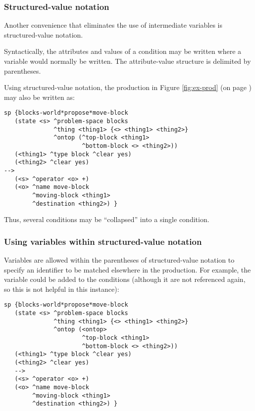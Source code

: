 \subsubsection{Structured-value notation}
\label{SYNTAX-pm-structured}    %

Another convenience that eliminates the use of intermediate variables is 
structured-value notation. 

Syntactically, the attributes and values of a condition may be written where a
variable would normally be written. The attribute-value structure is delimited
by parentheses.

Using structured-value notation, the production in Figure \ref{fig:ex-prod}
(on page \pageref{fig:ex-prod}) may also be written as:

\begin{verbatim}
sp {blocks-world*propose*move-block
   (state <s> ^problem-space blocks
              ^thing <thing1> {<> <thing1> <thing2>}
              ^ontop (^top-block <thing1>
                      ^bottom-block <> <thing2>))
   (<thing1> ^type block ^clear yes)
   (<thing2> ^clear yes)
-->
   (<s> ^operator <o> +)
   (<o> ^name move-block
        ^moving-block <thing1>
        ^destination <thing2>) }
\end{verbatim}

Thus, several conditions may be ``collapsed'' into a single condition.


\subsubsection*{Using variables within structured-value notation}

Variables are allowed within the parentheses of structured-value notation to
specify an identifier to be matched elsewhere in the production. For example,
the variable  could be added to the conditions (although it are
not referenced again, so this is not helpful in this instance):

\begin{verbatim}
sp {blocks-world*propose*move-block
   (state <s> ^problem-space blocks
              ^thing <thing1> {<> <thing1> <thing2>}
              ^ontop (<ontop> 
                      ^top-block <thing1>
                      ^bottom-block <> <thing2>))
   (<thing1> ^type block ^clear yes)
   (<thing2> ^clear yes)
   -->
   (<s> ^operator <o> +)
   (<o> ^name move-block
        ^moving-block <thing1>
        ^destination <thing2>) }
\end{verbatim}

